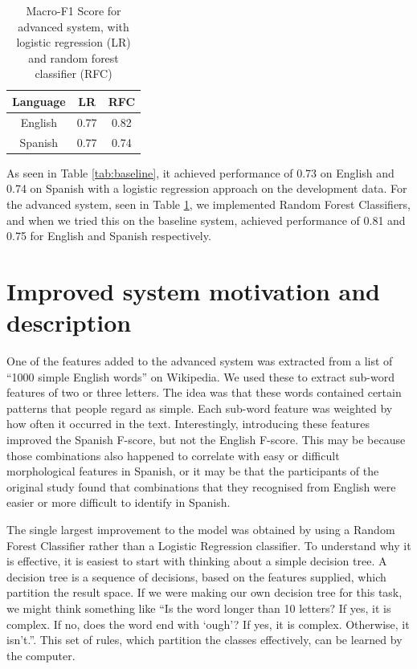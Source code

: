 \documentclass[11pt,a4paper]{article}
\begin{document}
\begin{table}[h]
\begin{center}
\begin{tabular}{|c|c|c|}
\hline
\textbf{Language} & \textbf{LR} & \textbf{RFC} \\
\hline
English & 0.77 & 0.82 \\ \hline
Spanish & 0.77 & 0.74 \\ \hline
\end{tabular}
\caption{Macro-F1 Score for advanced system, with logistic regression (LR) and random forest classifier (RFC)}
\label{tab:advanced}
\end{center}
\end{table}

As seen in Table \ref{tab:baseline}, it achieved performance of 0.73 on English and 0.74 on Spanish with a logistic regression approach on the development data. For the advanced system, seen in Table \ref{tab:advanced}, we implemented Random Forest Classifiers, and when we tried this on the baseline system, achieved performance of 0.81 and 0.75 for English and Spanish respectively.

\section{Improved system motivation and description}

One of the features added to the advanced system was extracted from a list of \enquote{1000 simple English words} on Wikipedia. We used these to extract sub-word features of two or three letters. The idea was that these words contained certain patterns that people regard as simple. Each sub-word feature was weighted by how often it occurred in the text. Interestingly, introducing these features improved the Spanish F-score, but not the English F-score. This may be because those combinations also happened to correlate with easy or difficult morphological features in Spanish, or it may be that the participants of the original study found that combinations that they recognised from English were easier or more difficult to identify in Spanish.

The single largest improvement to the model was obtained by using a Random Forest Classifier rather than a Logistic Regression classifier. To understand why it is effective, it is easiest to start with thinking about a simple decision tree. A decision tree is a sequence of decisions, based on the features supplied, which partition the result space. If we were making our own decision tree for this task, we might think something like \enquote{Is the word longer than 10 letters? If yes, it is complex. If no, does the word end with \enquote{ough}? If yes, it is complex. Otherwise, it isn't.}. This set of rules, which partition the classes effectively, can be learned by the computer. 
\end{document}
